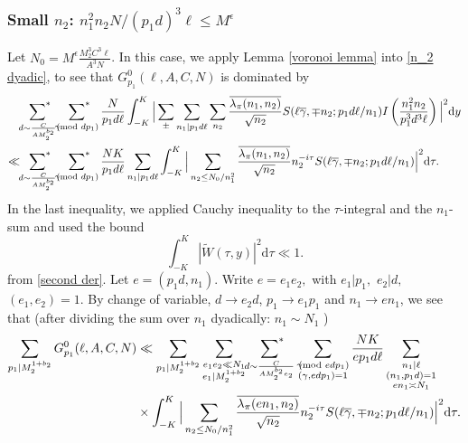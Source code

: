\documentclass[12pt,a4paper,twoside, reqno]{amsart}
\newcommand{\shortmod}{\ensuremath{\negthickspace \negthickspace \negthickspace \pmod}}
\newcommand{\sumstar}{\sideset{}{^*}\sum}
\begin{document}
\subsubsection{Small $n_2$: $ n_1^2n_2N/(p_1d)^3 \ell \leq M^\epsilon$}\label{small n}  Let $N_0= M^\epsilon \frac{M_2^3 C^3\ell  }{ A^3N}$.
In this case, we apply  Lemma \ref{voronoi lemma} into \eqref{n_2 dyadic}, to see that $ G_{p_1}^0(\ell, A,C,N)$ is dominated by 
\begin{align*}
       &\mathop{\sumstar_{ \substack{d \sim \frac{C}{A M_2^{b_2}}
       } } }   \sumstar_{\substack{ \gamma \shortmod{dp_1} }  }  \frac{ {N}}{p_1d  {\ell}} \int_{-K}^K \Big| \sum_{\pm} \sum_{n_1|p_1d\ell} \sum_{n_2 } \frac{\overline{\lambda_\pi(n_1,n_2)}}{ \sqrt{n_2} }S(\ell \overline{\gamma}, \mp n_2;p_1d\ell /n_1 )I \left( \frac{n_1^2n_2}{p_1^3d^3 \ell}\right) \Big|^2 \mathrm{d}y \\
        \ll & \mathop{\sumstar_{ \substack{d \sim \frac{C}{A M_2^{b_2}}
       } } }   \sumstar_{\substack{ \gamma \shortmod{dp_1} }  }  \frac{{N} K}{p_1d {\ell}} \sum_{n_1|p_1d\ell} \int_{-K}^K  \Big|   \sum_{ n_2 \leq N_0/n_1^2} \frac{\overline{\lambda_\pi(n_1,n_2)}}{ \sqrt{n_2}  } n_2^{{-i \tau}}S(\ell \overline{\gamma}, \mp n_2;p_1d\ell /n_1 )    \Big|^2  \mathrm{d}\tau.
\end{align*}
In the last inequality, we applied Cauchy inequality to the $\tau$-integral and the $n_1$-sum and used the bound $$ \int_{-K}^K |\widetilde{W}(\tau,y)|^2 \mathrm{d} \tau \ll 1.$$
from \eqref{second der}. 
Let $e=(p_1d,n_1)$. Write $e=e_1e_2,$ with $e_1|p_1,$  $e_2|d,$ $(e_1,e_2)=1$.  By change of variable, $d \rightarrow e_2d$, $p_1 \rightarrow e_1p_1$ and $n_1 \rightarrow en_1$, we see that (after dividing the sum over $n_1$ dyadically: $n_1 \sim N_1$ )
\begin{align}\label{n1 dyadic}
     \sum_{p_1| M_2^{1+b_2}} G_{p_1}^0(\ell, A,C,N) &\ll   \sum_{p_1| M_2^{1+b_2}} \mathop{\sum_{\substack {e_1e_2 \ll N_1 \\ e_1\mid M_2^{1+b_2} }   }} \mathop{\sumstar_{ \substack{d \sim \frac{C}{A M_2^{b_2} e_2}
       } } }  \sum_{\substack{ \gamma \shortmod{edp_1} \\ (\gamma, edp_1)=1 }   }  \frac{ {N} K}{ep_1d  {\ell}} \mathop{\sum_{ \substack{n_1|\ell \\ (n_1,p_1d)=1 \\ 
       en_1 \asymp N_1} }} \notag \\
     &  \times \int_{-K}^K \Big|   \sum_{  n_2 \leq N_0/n_1^2 } \frac{\overline{\lambda_\pi(en_1,n_2)}}{ \sqrt{n_2}  } n_2^{{-i \tau}}S(\ell \overline{\gamma}, \mp n_2;p_1d\ell /n_1 )    \Big|^2  \mathrm{d}\tau.
\end{align}
\end{document}
